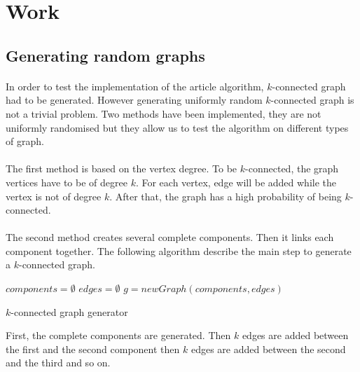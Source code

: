 \section{Work}

\subsection{Generating random graphs}
\paragraph{}
In order to test the implementation of the article algorithm, $k$-connected 
graph had to be generated. However generating uniformly random $k$-connected
graph is not a trivial problem. Two methods have been implemented, they are not
uniformly randomised but they allow us to test the algorithm on different types
of graph.

\paragraph{}
The first method is based on the vertex degree. To be $k$-connected, the graph
vertices have to be of degree $k$. For each vertex, edge will be added while
the vertex is not of degree $k$. After that, the graph has a high probability of
being $k$-connected.

\paragraph{}
The second method creates several complete components. Then it links each component
together. The following algorithm describe the main step to generate a $k$-connected graph.

\begin{algorithm}[!h]
    $components = \emptyset$\;
    $edges = \emptyset$\;
    $g = newGraph(components, edges)$\;
    \;
    \caption{$k$-connected graph generator}
\end{algorithm}

First, the complete components are generated. Then $k$ edges are added between the 
first and the second component then $k$ edges are added between the second and the 
third and so on.

